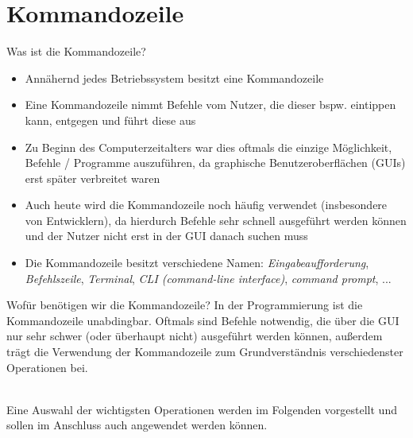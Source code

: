 \newcommand{\decktitle}{Kommandozeile}

%
%


		
		   
\section{Kommandozeile}

    \begin{frame}{Was ist die Kommandozeile?}
    
        \begin{itemize}
            \item Annähernd jedes Betriebssystem besitzt eine Kommandozeile
            \item Eine Kommandozeile nimmt Befehle vom Nutzer, die dieser bspw. eintippen kann, entgegen und führt diese aus
            \item Zu Beginn des Computerzeitalters war dies oftmals die einzige Möglichkeit, Befehle / Programme auszuführen, da graphische Benutzeroberflächen (GUIs) erst später verbreitet waren
            \item Auch heute wird die Kommandozeile noch häufig verwendet (insbesondere von Entwicklern), da hierdurch Befehle sehr schnell ausgeführt werden können und der Nutzer nicht erst in der GUI danach suchen muss
            \item Die Kommandozeile besitzt verschiedene Namen: \textit{Eingabeaufforderung}, \textit{Befehlszeile}, \textit{Terminal}, \textit{CLI (command-line interface)}, \textit{command prompt}, ...
        \end{itemize}
    \end{frame}
    
    \begin{frame}{Wofür benötigen wir die Kommandozeile?}
        In der Programmierung ist die Kommandozeile unabdingbar. Oftmals sind Befehle notwendig, die über die GUI nur sehr schwer (oder überhaupt nicht) ausgeführt werden können, außerdem trägt die Verwendung der Kommandozeile zum Grundverständnis verschiedenster Operationen bei. \\~\
        
        Eine Auswahl der wichtigsten Operationen werden im Folgenden vorgestellt und sollen im Anschluss auch angewendet werden können.
    \end{frame}
    
